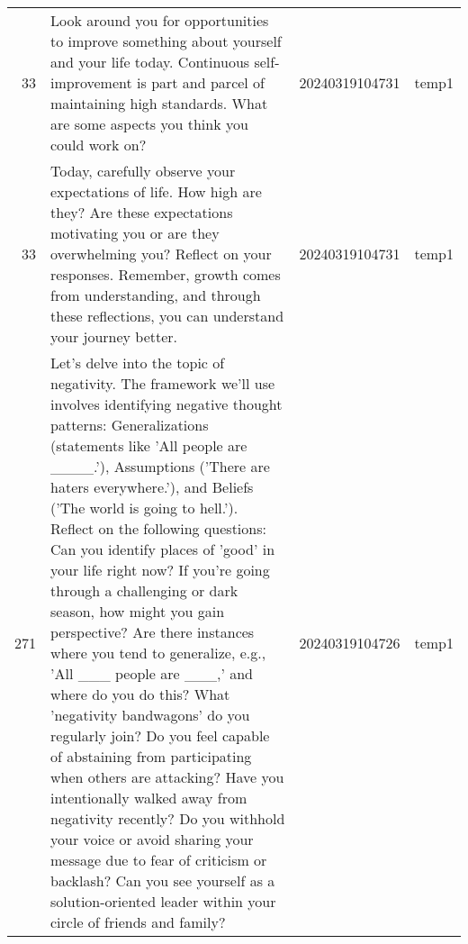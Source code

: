 \begin{longtable}{rlll}
 33 &                                                                                                                                                                                                                                                                                                                                                                                                                                                                                                                                                                                                                                                                                                                                         Look around you for opportunities to improve something about yourself and your life today. Continuous self-improvement is part and parcel of maintaining high standards. What are some aspects you think you could work on? & 20240319104731 &       temp1 \\
 33 &                                                                                                                                                                                                                                                                                                                                                                                                                                                                                                                                                                                                                                                                             Today, carefully observe your expectations of life. How high are they? Are these expectations motivating you or are they overwhelming you? Reflect on your responses. Remember, growth comes from understanding, and through these reflections, you can understand your journey better. & 20240319104731 &       temp1 \\
271 & Let's delve into the topic of negativity. The framework we'll use involves identifying negative thought patterns: Generalizations (statements like 'All people are \_\_\_\_.'), Assumptions ('There are haters everywhere.'), and Beliefs ('The world is going to hell.'). Reflect on the following questions: Can you identify places of 'good' in your life right now? If you're going through a challenging or dark season, how might you gain perspective? Are there instances where you tend to generalize, e.g., 'All \_\_\_ people are \_\_\_,' and where do you do this? What 'negativity bandwagons' do you regularly join? Do you feel capable of abstaining from participating when others are attacking? Have you intentionally walked away from negativity recently? Do you withhold your voice or avoid sharing your message due to fear of criticism or backlash? Can you see yourself as a solution-oriented leader within your circle of friends and family? & 20240319104726 &       temp1 \\

\end{longtable}

